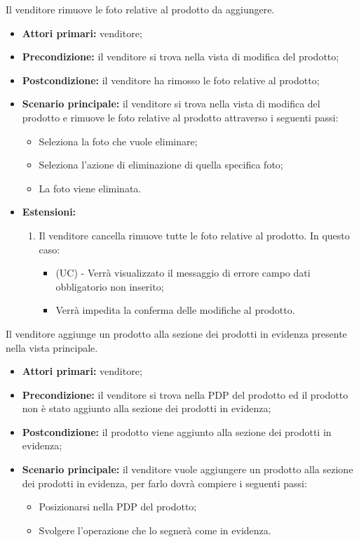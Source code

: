 Il venditore rimuove le foto relative al prodotto da aggiungere.
\begin{itemize}
    \item \textbf{Attori primari:} venditore;
    \item \textbf{Precondizione:} il venditore si trova nella vista di modifica del prodotto;
    \item \textbf{Postcondizione:} il venditore ha rimosso le foto relative al prodotto;
    \item \textbf{Scenario principale:} il venditore si trova nella vista di modifica del prodotto e rimuove le foto relative al prodotto attraverso i seguenti passi:
    \begin{itemize}
        \item Seleziona la foto che vuole eliminare;
        \item Seleziona l'azione di eliminazione di quella specifica foto;
        \item La foto viene eliminata.
    \end{itemize}
    \item \textbf{Estensioni:}
    \begin{enumerate}
    	\item Il venditore cancella rimuove tutte le foto relative al prodotto. In questo caso:
    	\begin{itemize}
    		\item (UC) - Verrà visualizzato il messaggio di errore campo dati obbligatorio non inserito;
    		\item Verrà impedita la conferma delle modifiche al prodotto.
    	\end{itemize}
    \end{enumerate}
\end{itemize}

Il venditore aggiunge un prodotto alla sezione dei prodotti in evidenza presente nella vista principale.
\begin{itemize}
    \item \textbf{Attori primari:} venditore;
    \item \textbf{Precondizione:} il venditore si trova nella PDP del prodotto ed il prodotto non è stato aggiunto alla sezione dei prodotti in evidenza;
    \item \textbf{Postcondizione:} il prodotto viene aggiunto alla sezione dei prodotti in evidenza;
    \item \textbf{Scenario principale:} il venditore vuole aggiungere un prodotto alla sezione dei prodotti in evidenza, per farlo dovrà compiere i seguenti passi:
    \begin{itemize}
        \item Posizionarsi nella PDP del prodotto;
        \item Svolgere l'operazione che lo segnerà come in evidenza.
    \end{itemize}
\end{itemize}

